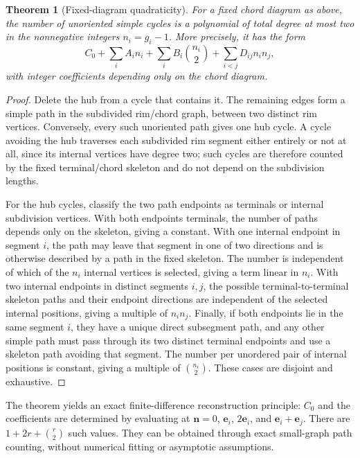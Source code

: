 \documentclass[9pt,a4paper,twocolumn]{extarticle}
\newtheorem{theorem}{Theorem}
\begin{document}
\begin{theorem}[Fixed-diagram quadraticity]\label{thm:quadratic}
For a fixed chord diagram as above, the number of unoriented simple cycles is a polynomial of total degree at most two in the nonnegative integers $n_i=g_i-1$. More precisely, it has the form
\begin{equation}\label{eq:binbasis}
C_0+\sum_i A_i n_i +\sum_i B_i\binom{n_i}{2}+\sum_{i<j}D_{ij}n_i n_j,
\end{equation}
with integer coefficients depending only on the chord diagram.
\end{theorem}
\begin{proof}
Delete the hub from a cycle that contains it. The remaining edges form a simple path in the subdivided rim/chord graph, between two distinct rim vertices. Conversely, every such unoriented path gives one hub cycle. A cycle avoiding the hub traverses each subdivided rim segment either entirely or not at all, since its internal vertices have degree two; such cycles are therefore counted by the fixed terminal/chord skeleton and do not depend on the subdivision lengths.

For the hub cycles, classify the two path endpoints as terminals or internal subdivision vertices. With both endpoints terminals, the number of paths depends only on the skeleton, giving a constant. With one internal endpoint in segment $i$, the path may leave that segment in one of two directions and is otherwise described by a path in the fixed skeleton. The number is independent of which of the $n_i$ internal vertices is selected, giving a term linear in $n_i$. With two internal endpoints in distinct segments $i,j$, the possible terminal-to-terminal skeleton paths and their endpoint directions are independent of the selected internal positions, giving a multiple of $n_i n_j$. Finally, if both endpoints lie in the same segment $i$, they have a unique direct subsegment path, and any other simple path must pass through its two distinct terminal endpoints and use a skeleton path avoiding that segment. The number per unordered pair of internal positions is constant, giving a multiple of $\binom{n_i}{2}$. These cases are disjoint and exhaustive.\end{proof}

The theorem yields an exact finite-difference reconstruction principle: $C_0$ and the coefficients are determined by evaluating at $\mathbf n=0$, $\mathbf e_i$, $2\mathbf e_i$, and $\mathbf e_i+\mathbf e_j$. There are $1+2r+\binom r2$ such values. They can be obtained through exact small-graph path counting, without numerical fitting or asymptotic assumptions.
\end{document}

